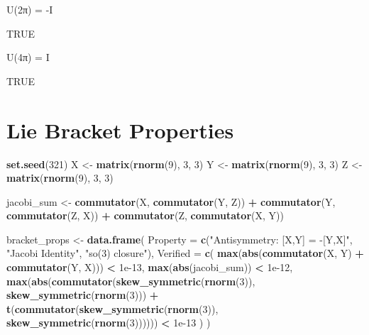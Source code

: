 \documentclass[
]{book}
\newenvironment{Shaded}{\begin{snugshade}}{\end{snugshade}}
\newcommand{\AttributeTok}[1]{\textcolor[rgb]{0.13,0.29,0.53}{#1}}
\newcommand{\DecValTok}[1]{\textcolor[rgb]{0.00,0.00,0.81}{#1}}
\newcommand{\FloatTok}[1]{\textcolor[rgb]{0.00,0.00,0.81}{#1}}
\newcommand{\FunctionTok}[1]{\textcolor[rgb]{0.13,0.29,0.53}{\textbf{#1}}}
\newcommand{\NormalTok}[1]{#1}
\newcommand{\OtherTok}[1]{\textcolor[rgb]{0.56,0.35,0.01}{#1}}
\newcommand{\SpecialCharTok}[1]{\textcolor[rgb]{0.81,0.36,0.00}{\textbf{#1}}}
\newcommand{\StringTok}[1]{\textcolor[rgb]{0.31,0.60,0.02}{#1}}
\theoremstyle{definition}
\theoremstyle{definition}
\theoremstyle{definition}
\theoremstyle{definition}
\theoremstyle{remark}
\begin{document}
U(2π) = -I

TRUE

U(4π) = I

TRUE

\section{Lie Bracket Properties}\label{lie-bracket-properties}

\begin{Shaded}
\begin{Highlighting}[]
\FunctionTok{set.seed}\NormalTok{(}\DecValTok{321}\NormalTok{)}
\NormalTok{X }\OtherTok{\textless{}{-}} \FunctionTok{matrix}\NormalTok{(}\FunctionTok{rnorm}\NormalTok{(}\DecValTok{9}\NormalTok{), }\DecValTok{3}\NormalTok{, }\DecValTok{3}\NormalTok{)}
\NormalTok{Y }\OtherTok{\textless{}{-}} \FunctionTok{matrix}\NormalTok{(}\FunctionTok{rnorm}\NormalTok{(}\DecValTok{9}\NormalTok{), }\DecValTok{3}\NormalTok{, }\DecValTok{3}\NormalTok{)}
\NormalTok{Z }\OtherTok{\textless{}{-}} \FunctionTok{matrix}\NormalTok{(}\FunctionTok{rnorm}\NormalTok{(}\DecValTok{9}\NormalTok{), }\DecValTok{3}\NormalTok{, }\DecValTok{3}\NormalTok{)}

\NormalTok{jacobi\_sum }\OtherTok{\textless{}{-}} \FunctionTok{commutator}\NormalTok{(X, }\FunctionTok{commutator}\NormalTok{(Y, Z)) }\SpecialCharTok{+}
              \FunctionTok{commutator}\NormalTok{(Y, }\FunctionTok{commutator}\NormalTok{(Z, X)) }\SpecialCharTok{+}
              \FunctionTok{commutator}\NormalTok{(Z, }\FunctionTok{commutator}\NormalTok{(X, Y))}

\NormalTok{bracket\_props }\OtherTok{\textless{}{-}} \FunctionTok{data.frame}\NormalTok{(}
  \AttributeTok{Property =} \FunctionTok{c}\NormalTok{(}\StringTok{"Antisymmetry: [X,Y] = {-}[Y,X]"}\NormalTok{, }
               \StringTok{"Jacobi Identity"}\NormalTok{,}
               \StringTok{"so(3) closure"}\NormalTok{),}
  \AttributeTok{Verified =} \FunctionTok{c}\NormalTok{(}
    \FunctionTok{max}\NormalTok{(}\FunctionTok{abs}\NormalTok{(}\FunctionTok{commutator}\NormalTok{(X, Y) }\SpecialCharTok{+} \FunctionTok{commutator}\NormalTok{(Y, X))) }\SpecialCharTok{\textless{}} \FloatTok{1e{-}13}\NormalTok{,}
    \FunctionTok{max}\NormalTok{(}\FunctionTok{abs}\NormalTok{(jacobi\_sum)) }\SpecialCharTok{\textless{}} \FloatTok{1e{-}12}\NormalTok{,}
    \FunctionTok{max}\NormalTok{(}\FunctionTok{abs}\NormalTok{(}\FunctionTok{commutator}\NormalTok{(}\FunctionTok{skew\_symmetric}\NormalTok{(}\FunctionTok{rnorm}\NormalTok{(}\DecValTok{3}\NormalTok{)), }
                      \FunctionTok{skew\_symmetric}\NormalTok{(}\FunctionTok{rnorm}\NormalTok{(}\DecValTok{3}\NormalTok{))) }\SpecialCharTok{+} 
           \FunctionTok{t}\NormalTok{(}\FunctionTok{commutator}\NormalTok{(}\FunctionTok{skew\_symmetric}\NormalTok{(}\FunctionTok{rnorm}\NormalTok{(}\DecValTok{3}\NormalTok{)), }
                       \FunctionTok{skew\_symmetric}\NormalTok{(}\FunctionTok{rnorm}\NormalTok{(}\DecValTok{3}\NormalTok{)))))) }\SpecialCharTok{\textless{}} \FloatTok{1e{-}13}
\NormalTok{  )}
\NormalTok{)}


\end{Highlighting}
\end{Shaded}
\end{document}
